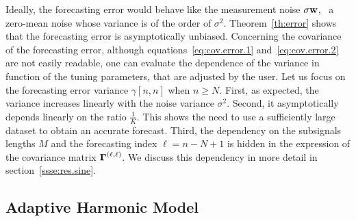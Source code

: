 Ideally, the forecasting error would behave like the measurement noise $\sigma{\mathbf w}$, \ie~a zero-mean noise whose variance is of the order of $\sigma^2$. Theorem~\ref{th:error} shows that the forecasting error is asymptotically unbiased. Concerning the covariance of the forecasting error, although equations~\eqref{eq:cov.error.1} and~\eqref{eq:cov.error.2} are not easily readable, one can evaluate the dependence of the variance in function of the tuning parameters, that are adjusted by the user. Let us focus on the forecasting error variance $\gamma[n,n]$ when $n\geq N$. First, as expected, the variance increases linearly with the noise variance $\sigma^2$. Second, it asymptotically depends linearly on the ratio $\frac{1}{K}$. This shows the need to use a sufficiently large dataset to obtain an accurate forecast. Third, the dependency on the subsignals lengths $M$ and the forecasting index $\ell=n-N+1$ is hidden in the expression of the covariance matrix $\boldsymbol{\Gamma}^{(\ell,\ell)}$. We discuss this dependency in more detail in section~\ref{ssse:res.sine}.

\subsection{Adaptive Harmonic Model}\label{RemarkAHM}

